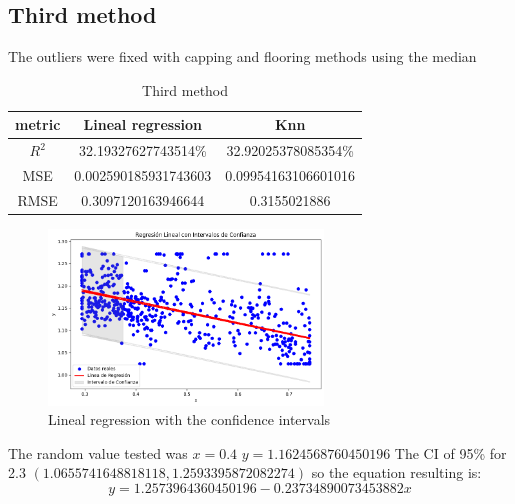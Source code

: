 \documentclass{article}
\begin{document}
\subsection{Third method}
The outliers were fixed with capping and flooring methods using the median
\begin{table}[H]
\begin{center}
  \begin{tabular}{|c|c|c|}
    \hline
     metric & Lineal regression & Knn \\ \hline
     $R^2$& 32.19327627743514\%&32.92025378085354\%\\
     MSE& 0.002590185931743603&0.09954163106601016\\
     RMSE&0.3097120163946644&0.3155021886\\
     \hline

  \end{tabular}
  \caption{Third method}

\end{center}
\end{table}
\begin{figure}[h]
  \center
  \includegraphics[width=0.65\textwidth]{model_3_3.png}
  \caption{Lineal regression with the confidence intervals}

  \label{fig:example_intervals_3}
\end{figure}
The random value tested was $x=0.4$ $ y=1.1624568760450196$
The CI of  95\% for 2.3 $(1.0655741648818118, 1.2593395872082274)$
so the equation resulting is: $$y=1.2573964360450196 -0.23734890073453882x $$
\end{document}
